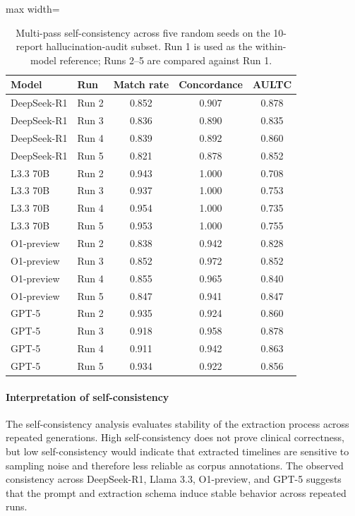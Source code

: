 \documentclass[pmlr,twocolumn,10pt]{jmlr} %
\begin{document}
\begin{table}[ht]
\centering
\small
\caption{Multi-pass self-consistency across five random seeds on the 10-report hallucination-audit subset. Run 1 is used as the within-model reference; Runs 2--5 are compared against Run 1.}
\label{tab:self_consistency}
\begin{adjustbox}{max width=\textwidth}
\begin{tabular}{llccc}
\toprule
Model & Run & Match rate & Concordance & AULTC \\
\midrule
DeepSeek-R1 & Run 2 & 0.852 & 0.907 & 0.878 \\
DeepSeek-R1 & Run 3 & 0.836 & 0.890 & 0.835 \\
DeepSeek-R1 & Run 4 & 0.839 & 0.892 & 0.860 \\
DeepSeek-R1 & Run 5 & 0.821 & 0.878 & 0.852 \\
\midrule
L3.3 70B & Run 2 & 0.943 & 1.000 & 0.708 \\
L3.3 70B & Run 3 & 0.937 & 1.000 & 0.753 \\
L3.3 70B & Run 4 & 0.954 & 1.000 & 0.735 \\
L3.3 70B & Run 5 & 0.953 & 1.000 & 0.755 \\
\midrule
O1-preview & Run 2 & 0.838 & 0.942 & 0.828 \\
O1-preview & Run 3 & 0.852 & 0.972 & 0.852 \\
O1-preview & Run 4 & 0.855 & 0.965 & 0.840 \\
O1-preview & Run 5 & 0.847 & 0.941 & 0.847 \\
\midrule
GPT-5 & Run 2 & 0.935 & 0.924 & 0.860 \\
GPT-5 & Run 3 & 0.918 & 0.958 & 0.878 \\
GPT-5 & Run 4 & 0.911 & 0.942 & 0.863 \\
GPT-5 & Run 5 & 0.934 & 0.922 & 0.856 \\
\bottomrule
\end{tabular}
\end{adjustbox}
\end{table}

\paragraph{Interpretation of self-consistency}
The self-consistency analysis evaluates stability of the extraction process across repeated generations.
High self-consistency does not prove clinical correctness, but low self-consistency would indicate that extracted timelines are sensitive to sampling noise and therefore less reliable as corpus annotations.
The observed consistency across DeepSeek-R1, Llama 3.3, O1-preview, and GPT-5 suggests that the prompt and extraction schema induce stable behavior across repeated runs.
\end{document}
